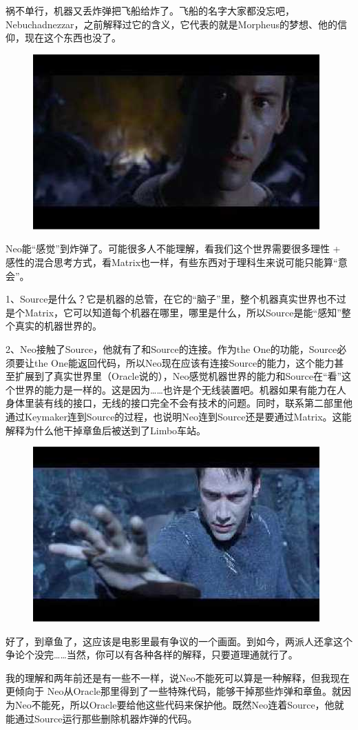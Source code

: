 \documentclass{ctexart}
\begin{document}
祸不单行，机器又丢炸弹把飞船给炸了。飞船的名字大家都没忘吧，Nebuchadnezzar，之前解释过它的含义，它代表的就是Morpheus的梦想、他的信仰，现在这个东西也没了。

\begin{figure}[htb]
\centering
\includegraphics[width=0.5\linewidth]{fig/read_reloaded-176}
\end{figure}

Neo能“感觉”到炸弹了。可能很多人不能理解，看我们这个世界需要很多理性 + 感性的混合思考方式，看Matrix也一样，有些东西对于理科生来说可能只能算“意会”。

1、Source是什么？它是机器的总管，在它的“脑子”里，整个机器真实世界也不过是个Matrix，它可以知道每个机器在哪里，哪里是什么，所以Source是能“感知”整个真实的机器世界的。

2、Neo接触了Source，他就有了和Source的连接。作为the One的功能，Source必须要让the One能返回代码，所以Neo现在应该有连接Source的能力，这个能力甚至扩展到了真实世界里（Oracle说的），Neo感觉机器世界的能力和Source在“看”这个世界的能力是一样的。这是因为……也许是个无线装置吧。机器如果有能力在人身体里装有线的接口，无线的接口完全不会有技术的问题。同时，联系第二部里他通过Keymaker连到Source的过程，也说明Neo连到Source还是要通过Matrix。这能解释为什么他干掉章鱼后被送到了Limbo车站。

\begin{figure}[htb]
\centering
\includegraphics[width=0.5\linewidth]{fig/read_reloaded-177}
\end{figure}

好了，到章鱼了，这应该是电影里最有争议的一个画面。到如今，两派人还拿这个争论个没完……当然，你可以有各种各样的解释，只要道理通就行了。

我的理解和两年前还是有一些不一样，说Neo不能死可以算是一种解释，但我现在更倾向于 Neo从Oracle那里得到了一些特殊代码，能够干掉那些炸弹和章鱼。就因为Neo不能死，所以Oracle要给他这些代码来保护他。既然Neo连着Source，他就能通过Source运行那些删除机器炸弹的代码。
\end{document}
